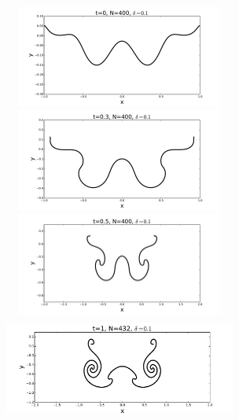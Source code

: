 \documentclass[12pt,twoside]{article}
\begin{document}
\begin{figure}
\begin{center}
	\includegraphics[width=3in,height=1.33in]{FU1.pdf}

	\includegraphics[width=3in,height=1.33in]{FU2.pdf}

	\includegraphics[width=3in,height=1.33in]{FU3.pdf}

	\includegraphics[width=3in,height=1.33in]{FU4.pdf}


\end{center}
\end{figure}
\end{document}
